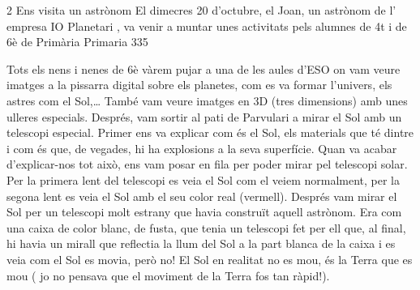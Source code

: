 \begin{news}
{2} %
{Ens visita un astrònom}
{El dimecres 20 d’octubre, el Joan,  un astrònom  de l’ empresa IO Planetari , va venir a muntar unes activitats pels alumnes de 4t i de 6è de Primària}
{Primaria}
{335} %

\noindent{}

Tots els nens i nenes de 6è vàrem pujar a una de les aules d’ESO on vam veure imatges a la pissarra digital sobre els planetes, com es va formar l’univers, els astres com el Sol,… També vam veure imatges en 3D (tres dimensions) amb unes ulleres especials. Després, vam sortir al pati de Parvulari a mirar el Sol amb un telescopi especial. Primer ens va explicar com és el Sol, els materials que té  dintre i com és que, de vegades, hi ha explosions a la seva superfície. Quan va acabar d’explicar-nos tot això, ens vam posar en fila per poder mirar pel telescopi solar. Per la primera lent del telescopi es veia el Sol com el veiem normalment, per la segona lent es veia el Sol amb el seu color real (vermell). Després vam mirar el Sol per un telescopi molt estrany que havia construït aquell astrònom. Era com una caixa de color blanc, de fusta, que tenia un telescopi  fet per ell que, al final,  hi havia un mirall que reflectia la llum del Sol a la part blanca de la caixa i es veia com el Sol es movia, però no!  El Sol en realitat no es mou, és la Terra que es mou ( jo no pensava que el moviment de la Terra fos tan ràpid!). 


\end{news}

